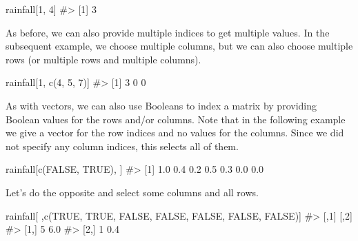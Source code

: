 \documentclass[
  letterpaper,
]{latex/krantz}
\makeatletter
\newenvironment{Shaded}{\begin{snugshade}}{\end{snugshade}}
\newcommand{\CommentTok}[1]{\textcolor[rgb]{0.37,0.37,0.37}{#1}}
\newcommand{\ConstantTok}[1]{\textcolor[rgb]{0.56,0.35,0.01}{#1}}
\newcommand{\DecValTok}[1]{\textcolor[rgb]{0.68,0.00,0.00}{#1}}
\newcommand{\FunctionTok}[1]{\textcolor[rgb]{0.28,0.35,0.67}{#1}}
\newcommand{\NormalTok}[1]{\textcolor[rgb]{0.00,0.23,0.31}{#1}}
\newenvironment{kframe}{%
\medskip{}
\setlength{\fboxsep}{.8em}
 \def\at@end@of@kframe{}%
 \ifinner\ifhmode%
  \def\at@end@of@kframe{\end{minipage}}%
  \begin{minipage}{\columnwidth}%
 \fi\fi%
 \def\FrameCommand##1{\hskip\@totalleftmargin \hskip-\fboxsep
 \colorbox{shadecolor}{##1}\hskip-\fboxsep
     \hskip-\linewidth \hskip-\@totalleftmargin \hskip\columnwidth}%
 \MakeFramed {\advance\hsize-\width
   \@totalleftmargin\z@ \linewidth\hsize
   \@setminipage}}%
 {\par\unskip\endMakeFramed%
 \at@end@of@kframe}
\renewenvironment{Shaded}{\begin{kframe}}{\end{kframe}}
\makeatother
\begin{document}
\begin{Shaded}
\begin{Highlighting}[]
\NormalTok{rainfall[}\DecValTok{1}\NormalTok{, }\DecValTok{4}\NormalTok{]}
\CommentTok{\#\textgreater{} [1] 3}
\end{Highlighting}
\end{Shaded}

As before, we can also provide multiple indices to get multiple values.
In the subsequent example, we choose multiple columns, but we can also
choose multiple rows (or multiple rows and multiple columns).

\begin{Shaded}
\begin{Highlighting}[]
\NormalTok{rainfall[}\DecValTok{1}\NormalTok{, }\FunctionTok{c}\NormalTok{(}\DecValTok{4}\NormalTok{, }\DecValTok{5}\NormalTok{, }\DecValTok{7}\NormalTok{)]}
\CommentTok{\#\textgreater{} [1] 3 0 0}
\end{Highlighting}
\end{Shaded}

As with vectors, we can also use Booleans to index a matrix by providing
Boolean values for the rows and/or columns. Note that in the following
example we give a vector for the row indices and no values for the
columns. Since we did not specify any column indices, this selects all
of them.

\begin{Shaded}
\begin{Highlighting}[]
\NormalTok{rainfall[}\FunctionTok{c}\NormalTok{(}\ConstantTok{FALSE}\NormalTok{, }\ConstantTok{TRUE}\NormalTok{), ]}
\CommentTok{\#\textgreater{} [1] 1.0 0.4 0.2 0.5 0.3 0.0 0.0}
\end{Highlighting}
\end{Shaded}

Let's do the opposite and select some columns and all rows.

\begin{Shaded}
\begin{Highlighting}[]
\NormalTok{rainfall[ ,}\FunctionTok{c}\NormalTok{(}\ConstantTok{TRUE}\NormalTok{, }\ConstantTok{TRUE}\NormalTok{, }\ConstantTok{FALSE}\NormalTok{, }\ConstantTok{FALSE}\NormalTok{, }\ConstantTok{FALSE}\NormalTok{, }\ConstantTok{FALSE}\NormalTok{, }\ConstantTok{FALSE}\NormalTok{)]}
\CommentTok{\#\textgreater{}      [,1] [,2]}
\CommentTok{\#\textgreater{} [1,]    5  6.0}
\CommentTok{\#\textgreater{} [2,]    1  0.4}
\end{Highlighting}
\end{Shaded}
\end{document}
